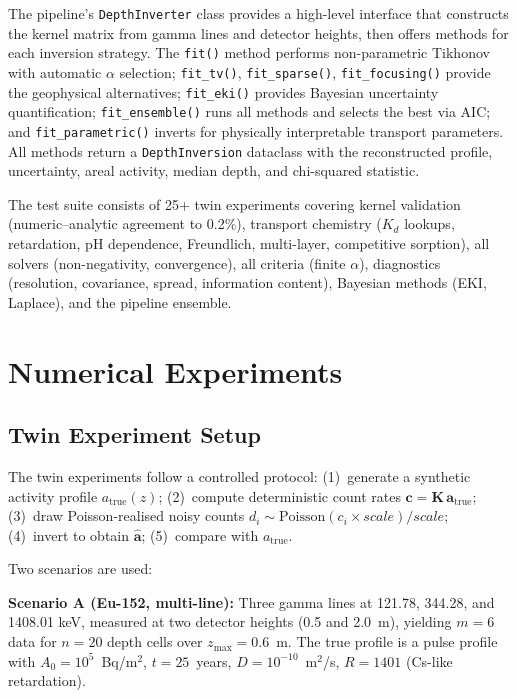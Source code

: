 \documentclass[a4paper,11pt]{article}
\begin{document}
The pipeline's \texttt{DepthInverter} class provides a high-level
interface that constructs the kernel matrix from gamma lines and
detector heights, then offers methods for each inversion strategy.
The \texttt{fit()} method performs non-parametric Tikhonov with automatic
$\alpha$ selection; \texttt{fit\_tv()}, \texttt{fit\_sparse()},
\texttt{fit\_focusing()} provide the geophysical alternatives;
\texttt{fit\_eki()} provides Bayesian uncertainty quantification;
\texttt{fit\_ensemble()} runs all methods and selects the best via AIC;
and \texttt{fit\_parametric()} inverts for physically interpretable transport
parameters.  All methods return a \texttt{DepthInversion} dataclass with
the reconstructed profile, uncertainty, areal activity, median depth,
and chi-squared statistic.

The test suite consists of 25+ twin experiments covering kernel
validation (numeric--analytic agreement to 0.2\%), transport chemistry
($K_d$ lookups, retardation, pH dependence, Freundlich, multi-layer,
competitive sorption), all solvers (non-negativity, convergence), all
criteria (finite $\alpha$), diagnostics (resolution, covariance, spread,
information content), Bayesian methods (EKI, Laplace), and the pipeline
ensemble.


\section{Numerical Experiments}\label{sec:experiments}

\subsection{Twin Experiment Setup}

The twin experiments follow a controlled protocol: (1)~generate a
synthetic activity profile $a_{\mathrm{true}}(z)$; (2)~compute
deterministic count rates $\bm{c} = \bm{K}\,\bm{a}_{\mathrm{true}}$;
(3)~draw Poisson-realised noisy counts $d_i \sim \mathrm{Poisson}(c_i \times\mathit{scale}) / \mathit{scale}$;
(4)~invert to obtain $\hat{\bm{a}}$; (5)~compare with $a_{\mathrm{true}}$.

Two scenarios are used:

\textbf{Scenario A (Eu-152, multi-line):} Three gamma lines at
121.78, 344.28, and 1408.01 keV, measured at two detector heights
(0.5 and 2.0~m), yielding $m = 6$ data for $n = 20$ depth cells over
$z_{\max} = 0.6$~m.  The true profile is a pulse profile with
$A_0 = 10^5$~Bq/m$^2$, $t = 25$~years, $D = 10^{-10}$~m$^2$/s,
$R = 1401$ (Cs-like retardation).
\end{document}
